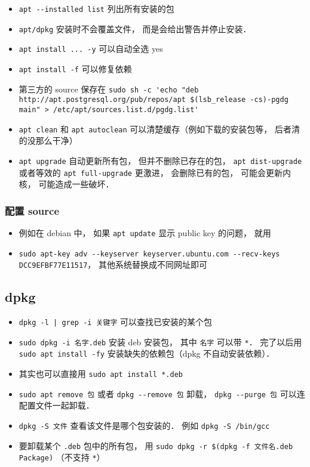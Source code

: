 \begin{itemize}
\item \verb|apt --installed list| 列出所有安装的包
\item \verb|apt/dpkg| 安装时不会覆盖文件， 而是会给出警告并停止安装．
\item \verb|apt install ... -y| 可以自动全选 yes
\item \verb|apt install -f| 可以修复依赖
\item 第三方的 source 保存在 \verb|sudo sh -c 'echo "deb http://apt.postgresql.org/pub/repos/apt $(lsb_release -cs)-pgdg main" > /etc/apt/sources.list.d/pgdg.list'|
\item \verb|apt clean| 和 \verb|apt autoclean| 可以清楚缓存（例如下载的安装包等， 后者清的没那么干净）
\item \verb|apt upgrade| 自动更新所有包， 但并不删除已存在的包， \verb|apt dist-upgrade| 或者等效的 \verb|apt full-upgrade| 更激进， 会删除已有的包， 可能会更新内核， 可能造成一些破坏．
\end{itemize}

\subsubsection{配置 source}
\begin{itemize}
\item 例如在 debian 中， 如果 \verb|apt update| 显示 public key 的问题， 就用
\item \verb|sudo apt-key adv --keyserver keyserver.ubuntu.com --recv-keys DCC9EFBF77E11517|， 其他系统替换成不同网址即可
\end{itemize}


\subsection{dpkg}
\begin{itemize}
\item \verb`dpkg -l | grep -i 关键字` 可以查找已安装的某个包
\item \verb|sudo dpkg -i 名字.deb| 安装 deb 安装包， 其中 \verb|名字| 可以带 \verb|*|． 完了以后用 \verb|sudo apt install -fy| 安装缺失的依赖包（dpkg 不自动安装依赖）．
\item 其实也可以直接用 \verb|sudo apt install *.deb|
\item \verb|sudo apt remove 包| 或者 \verb|dpkg --remove 包| 卸载， \verb|dpkg --purge 包| 可以连配置文件一起卸载．
\item \verb|dpkg -S 文件| 查看该文件是哪个包安装的． 例如 \verb|dpkg -S /bin/gcc|
\item 要卸载某个 \verb|.deb| 包中的所有包， 用 \verb|sudo dpkg -r $(dpkg -f 文件名.deb Package)| （不支持 \verb|*|）
\end{itemize}

